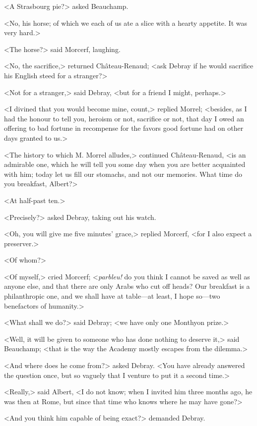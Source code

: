  <A Strasbourg pie?> asked Beauchamp. 

 <No, his horse; of which we each of us ate a slice with a hearty appetite. It was very hard.> 

 <The horse?> said Morcerf, laughing. 

 <No, the sacrifice,> returned Château-Renaud; <ask Debray if he would sacrifice his English steed for a stranger?> 

 <Not for a stranger,> said Debray, <but for a friend I might, perhaps.> 

 <I divined that you would become mine, count,> replied Morrel; <besides, as I had the honour to tell you, heroism or not, sacrifice or not, that day I owed an offering to bad fortune in recompense for the favors good fortune had on other days granted to us.> 

 <The history to which M. Morrel alludes,> continued Château-Renaud, <is an admirable one, which he will tell you some day when you are better acquainted with him; today let us fill our stomachs, and not our memories. What time do you breakfast, Albert?> 

 <At half-past ten.> 

 <Precisely?> asked Debray, taking out his watch. 

 <Oh, you will give me five minutes' grace,> replied Morcerf, <for I also expect a preserver.> 

 <Of whom?> 

 <Of myself,> cried Morcerf; <\textit{parbleu!} do you think I cannot be saved as well as anyone else, and that there are only Arabs who cut off heads? Our breakfast is a philanthropic one, and we shall have at table—at least, I hope so—two benefactors of humanity.> 

 <What shall we do?> said Debray; <we have only one Monthyon prize.> 

 <Well, it will be given to someone who has done nothing to deserve it,> said Beauchamp; <that is the way the Academy mostly escapes from the dilemma.> 

 <And where does he come from?> asked Debray. <You have already answered the question once, but so vaguely that I venture to put it a second time.> 

 <Really,> said Albert, <I do not know; when I invited him three months ago, he was then at Rome, but since that time who knows where he may have gone?> 

 <And you think him capable of being exact?> demanded Debray. 

